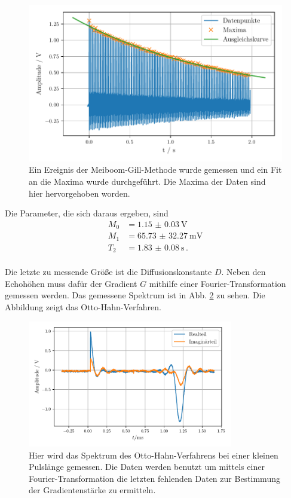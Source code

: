 \begin{figure}
    \centering
    \includegraphics[width=\textwidth]{plots/T2.pdf}
    \caption{Ein Ereignis der Meiboom-Gill-Methode wurde gemessen und ein Fit an die Maxima wurde durchgeführt. Die Maxima der Daten sind hier hervorgehoben worden.}
    \label{abb:t2}
\end{figure}

Die Parameter, die sich daraus ergeben, sind 
\begin{align*}
    M_0 &= \SI{1.15(3)}{\volt} \\
    M_1 &= \SI{65.73(3227)}{\milli\volt} \\
    T_2 &= \SI{1.83(8)}{\second} \,. \\
\end{align*}

Die letzte zu messende Größe ist die Diffusionskonstante $D$. Neben den Echohöhen muss dafür der Gradient $G$ mithilfe einer Fourier-Transformation gemessen werden. 
Das gemessene Spektrum ist in Abb. \ref{abb:spektrum} zu sehen. Die Abbildung zeigt das Otto-Hahn-Verfahren.
\begin{figure}
    \centering
    \includegraphics[width=0.8\textwidth]{plots/spektrum.pdf}
    \caption{Hier wird das Spektrum des Otto-Hahn-Verfahrens bei einer kleinen Pulslänge gemessen. Die Daten werden benutzt um mittels einer Fourier-Transformation die letzten fehlenden Daten zur Bestimmung der Gradientenstärke zu ermitteln.}
    \label{abb:spektrum}
\end{figure}

